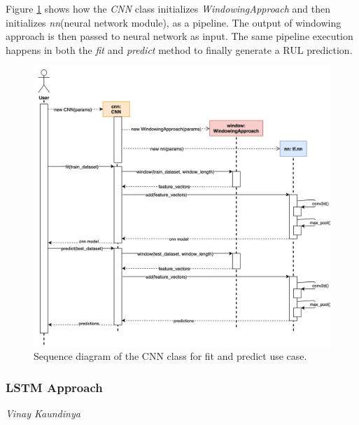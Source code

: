 Figure \ref{fig:rul_seq_cnn} shows how the \textit{CNN} class initializes \textit{WindowingApproach} and then initializes \textit{nn}(neural network module), as a pipeline. The output of windowing approach is then passed to neural network as input. The same pipeline execution happens in both the \textit{fit} and \textit{predict} method to finally generate a RUL prediction.
\begin{figure}[H]
    \centering
    \includegraphics[width=\textwidth]{gfx/rul_seq_cnn}
    \caption{Sequence diagram of the CNN class for fit and predict use case.}
    \label{fig:rul_seq_cnn}
\end{figure}

\subsubsection{LSTM Approach}
\vspace*{-12.5mm}\hfill{\normalsize\emph{Vinay Kaundinya}}

